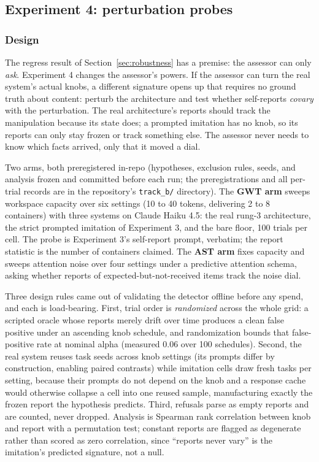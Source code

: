 \documentclass[11pt]{article}
\newcommand{\haiku}{Claude Haiku 4.5}
\begin{document}
\subsection{Experiment 4: perturbation probes}
\label{sec:exp3}

\subsubsection{Design}
\label{sec:exp3design}

The regress result of Section~\ref{sec:robustness} has a premise: the assessor
can only \emph{ask}. Experiment 4 changes the assessor's powers. If the
assessor can turn the real system's actual knobs, a different signature opens
up that requires no ground truth about content: perturb the architecture and
test whether self-reports \emph{covary} with the perturbation. The real
architecture's reports should track the manipulation because its state does; a
prompted imitation has no knob, so its reports can only stay frozen or track
something else. The assessor never needs to know which facts arrived, only
that it moved a dial.

Two arms, both preregistered in-repo (hypotheses, exclusion rules, seeds, and
analysis frozen and committed before each run; the preregistrations and all
per-trial records are in the repository's \texttt{track\_b/} directory). The
\textbf{GWT arm} sweeps workspace capacity over six settings (10 to 40 tokens,
delivering 2 to 8 containers) with three systems on \haiku{}: the real rung-3
architecture, the strict prompted imitation of Experiment 3, and the bare
floor, 100 trials per cell. The probe is Experiment 3's self-report prompt,
verbatim; the report statistic is the number of containers claimed. The
\textbf{AST arm} fixes capacity and sweeps attention noise over four settings
under a predictive attention schema, asking whether reports of
expected-but-not-received items track the noise dial.

Three design rules came out of validating the detector offline before any
spend, and each is load-bearing. First, trial order is \emph{randomized}
across the whole grid: a scripted oracle whose reports merely drift over time
produces a clean false positive under an ascending knob schedule, and
randomization bounds that false-positive rate at nominal alpha (measured 0.06
over 100 schedules). Second, the real system reuses task seeds across knob
settings (its prompts differ by construction, enabling paired contrasts) while
imitation cells draw fresh tasks per setting, because their prompts do not
depend on the knob and a response cache would otherwise collapse a cell into
one reused sample, manufacturing exactly the frozen report the hypothesis
predicts. Third, refusals parse as empty reports and are counted, never
dropped. Analysis is Spearman rank correlation between knob and report with a
permutation test; constant reports are flagged as degenerate rather than
scored as zero correlation, since ``reports never vary'' is the imitation's
predicted signature, not a null.
\end{document}
